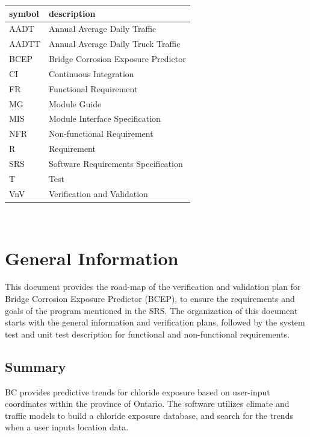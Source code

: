 \documentclass[12pt, titlepage]{article}
\begin{document}
\renewcommand{\arraystretch}{1.2}
\begin{tabular}{l l} 
  \toprule		
  \textbf{symbol} & \textbf{description}\\
  \midrule 

  AADT & Annual Average Daily Traffic\\
  AADTT & Annual Average Daily Truck Traffic \\
  BCEP & Bridge Corrosion Exposure Predictor\\
  CI & Continuous Integration\\
  FR & Functional Requirement\\
  MG & Module Guide\\
  MIS & Module Interface Specification\\
  NFR & Non-functional Requirement\\
  R & Requirement\\
  SRS & Software Requirements Specification\\
  T & Test\\
  VnV & Verification and Validation\\
  
  \bottomrule
\end{tabular}\\



\newpage


\section{General Information}

This document provides the road-map of the verification and validation plan for Bridge Corrosion Exposure Predictor (BCEP), to ensure the requirements and goals of the program mentioned in the SRS. The organization of this document starts with the general information and verification plans, followed by the system test and unit test description for functional and non-functional requirements. 

\subsection{Summary}

BC provides predictive trends for chloride exposure based on user-input coordinates within the province of Ontario. The software utilizes climate and traffic models to build a chloride exposure database, and search for the trends when a user inputs location data.
\end{document}
